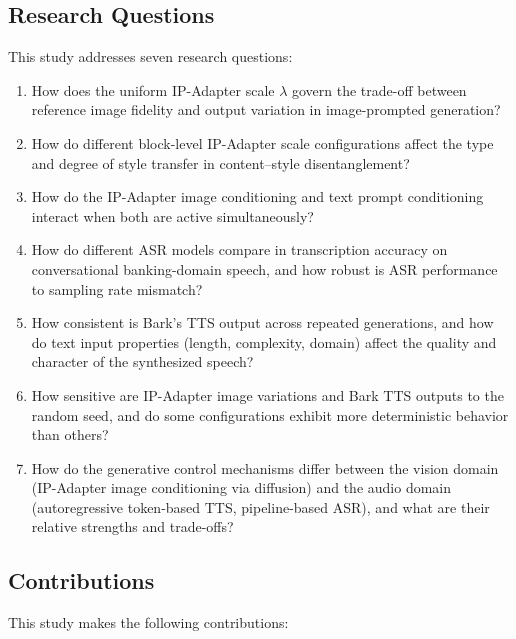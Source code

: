 \documentclass[conference]{IEEEtran}
\newcommand{\ipadapter}{IP-Adapter}
\begin{document}
\subsection{Research Questions}

This study addresses seven research questions:

\begin{enumerate}
    \item[\textbf{RQ1.}] How does the uniform \ipadapter{} scale \(\lambda\) govern the trade-off between reference image fidelity and output variation in image-prompted generation?
    \item[\textbf{RQ2.}] How do different block-level \ipadapter{} scale configurations affect the type and degree of style transfer in content--style disentanglement?
    \item[\textbf{RQ3.}] How do the \ipadapter{} image conditioning and text prompt conditioning interact when both are active simultaneously?
    \item[\textbf{RQ4.}] How do different ASR models compare in transcription accuracy on conversational banking-domain speech, and how robust is ASR performance to sampling rate mismatch?
    \item[\textbf{RQ5.}] How consistent is Bark's TTS output across repeated generations, and how do text input properties (length, complexity, domain) affect the quality and character of the synthesized speech?
    \item[\textbf{RQ6.}] How sensitive are \ipadapter{} image variations and Bark TTS outputs to the random seed, and do some configurations exhibit more deterministic behavior than others?
    \item[\textbf{RQ7.}] How do the generative control mechanisms differ between the vision domain (\ipadapter{} image conditioning via diffusion) and the audio domain (autoregressive token-based TTS, pipeline-based ASR), and what are their relative strengths and trade-offs?
\end{enumerate}

\subsection{Contributions}

This study makes the following contributions:
\end{document}
